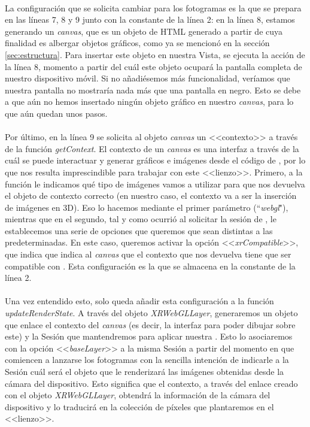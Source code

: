 \documentclass{subfiles}
\begin{document}
        \paragraph{}
        La configuración que se solicita cambiar para los fotogramas es la que se prepara en las líneas 7, 8 y 9 junto con la constante de la línea 2: en la línea  8, estamos generando un \textit{canvas}, que es un objeto de HTML generado a partir de \js cuya finalidad es albergar objetos gráficos, como ya se mencionó en la sección \ref{sec:estructura}. Para insertar este objeto en nuestra Vista, se ejecuta la acción de la línea 8, momento a partir del cuál este objeto ocupará la pantalla completa de nuestro dispositivo móvil. Si no añadiésemos más funcionalidad, veríamos que nuestra pantalla no mostraría nada más que una pantalla en negro. Esto se debe a que aún no hemos insertado ningún objeto gráfico en nuestro \textit{canvas}, para lo que aún quedan unos pasos.

        \paragraph{}
        Por último, en la línea 9 se solicita al objeto \textit{canvas} un <<contexto>> a través de la función \textit{getContext}. El contexto de un \textit{canvas} es una interfaz a través de la cuál se puede interactuar y generar gráficos e imágenes desde el código de \js \cite{web:canvascontext}, por lo que nos resulta imprescindible para trabajar con este <<lienzo>>. Primero, a la función le indicamos qué tipo de imágenes vamos a utilizar para que nos devuelva el objeto de contexto correcto (en nuestro caso, el contexto va a ser la inserción de imágenes en 3D). Eso lo hacemos mediante el primer parámetro (``\textit{webgl}"), mientras que en el segundo, tal y como ocurrió al solicitar la sesión de \webxr, le establecemos una serie de opciones que queremos que sean distintas a las predeterminadas. En este caso, queremos activar la opción <<\textit{xrCompatible}>>, que indica que indica al \textit{canvas} que el contexto que nos devuelva tiene que ser compatible con \webxr \cite{web:getcontext}. Esta configuración es la que se almacena en la constante de la línea 2.

        \paragraph{}
        Una vez entendido esto, solo queda añadir esta configuración a la función \textit{updateRenderState}. A través del objeto \textit{XRWebGLLayer}, generaremos un objeto que enlace el contexto del \textit{canvas} (es decir, la interfaz para poder dibujar sobre este) y la Sesión \webxr que mantendremos para aplicar nuestra \ra \cite{web:xrwebgllayer}. Esto lo asociaremos con la opción <<\textit{baseLayer}>> a la misma Sesión a partir del momento en que comiencen a lanzarse los fotogramas con la sencilla intención de indicarle a la Sesión cuál será el objeto que le renderizará las imágenes obtenidas desde la cámara del dispositivo. Esto significa que el contexto, a través del enlace creado con el objeto \textit{XRWebGLLayer}, obtendrá la información de la cámara del dispositivo y lo traducirá en la colección de píxeles que plantaremos en el <<lienzo>>.
\end{document}
